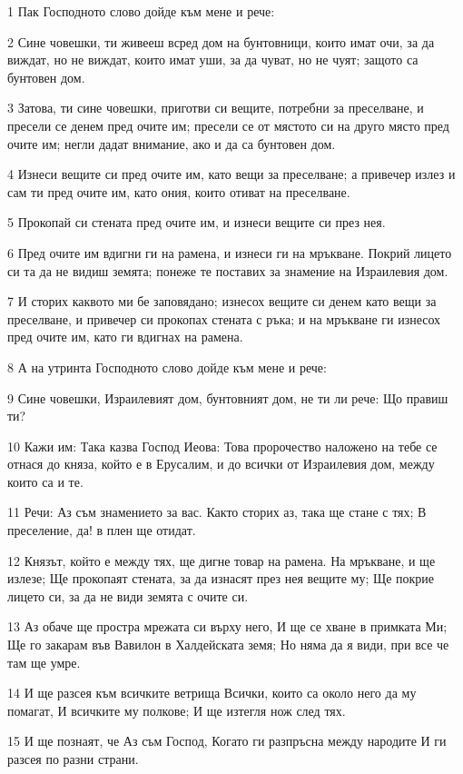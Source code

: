 \par 1 Пак Господното слово дойде към мене и рече:
\par 2 Сине човешки, ти живееш всред дом на бунтовници, които имат очи, за да виждат, но не виждат, които имат уши, за да чуват, но не чуят; защото са бунтовен дом.
\par 3 Затова, ти сине човешки, приготви си вещите, потребни за преселване, и пресели се денем пред очите им; пресели се от мястото си на друго място пред очите им; негли дадат внимание, ако и да са бунтовен дом.
\par 4 Изнеси вещите си пред очите им, като вещи за преселване; а привечер излез и сам ти пред очите им, като ония, които отиват на преселване.
\par 5 Прокопай си стената пред очите им, и изнеси вещите си през нея.
\par 6 Пред очите им вдигни ги на рамена, и изнеси ги на мръкване. Покрий лицето си та да не видиш земята; понеже те поставих за знамение на Израилевия дом.
\par 7 И сторих каквото ми бе заповядано; изнесох вещите си денем като вещи за преселване, и привечер си прокопах стената с ръка; и на мръкване ги изнесох пред очите им, като ги вдигнах на рамена.
\par 8 А на утринта Господното слово дойде към мене и рече:
\par 9 Сине човешки, Израилевият дом, бунтовният дом, не ти ли рече: Що правиш ти?
\par 10 Кажи им: Така казва Господ Иеова: Това пророчество наложено на тебе се отнася до княза, който е в Ерусалим, и до всички от Израилевия дом, между които са и те.
\par 11 Речи: Аз съм знамението за вас. Както сторих аз, така ще стане с тях; В преселение, да! в плен ще отидат.
\par 12 Князът, който е между тях, ще дигне товар на рамена. На мръкване, и ще излезе; Ще прокопаят стената, за да изнасят през нея вещите му; Ще покрие лицето си, за да не види земята с очите си.
\par 13 Аз обаче ще простра мрежата си върху него, И ще се хване в примката Ми; Ще го закарам във Вавилон в Халдейската земя; Но няма да я види, при все че там ще умре.
\par 14 И ще разсея към всичките ветрища Всички, които са около него да му помагат, И всичките му полкове; И ще изтегля нож след тях.
\par 15 И ще познаят, че Аз съм Господ, Когато ги разпръсна между народите И ги разсея по разни страни.
